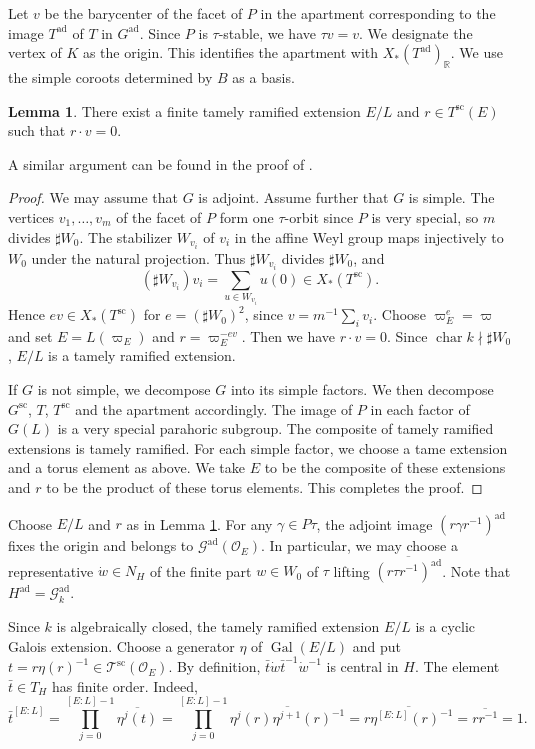 \documentclass[12pt]{article}
\DeclareMathOperator{\ad}{ad}
\newcommand\cO{\mathcal O}
\newcommand\cG{\mathcal G}
\newcommand\vp{\varpi}
\theoremstyle{definition}
\newtheorem{lemm}[theo]{Lemma}
\DeclareMathOperator{\Gal}{Gal}
\newcommand{\scs}{\mathrm{sc}}
\begin{document}
Let $v$ be the barycenter of the facet of $P$ in the apartment corresponding to the image $T^{\ad}$ of $T$ in $G^{\ad}$.
Since $P$ is $\tau$-stable, we have $\tau v=v$.
We designate the vertex of $K$ as the origin. This identifies the apartment with $X_*(T^{\ad})_{\mathbb R}$.
We use the simple coroots determined by $B$ as a basis.
\begin{lemm}\label{tame-extension}
There exist a finite tamely ramified extension $E/L$ and $r\in T^{\scs}(E)$ such that $r\cdot v=0$.
\end{lemm}

A similar argument can be found in the proof of \cite[Proposition 2.8]{PR24}.

\begin{proof}
We may assume that $G$ is adjoint.
Assume further that $G$ is simple.
The vertices $v_1,\ldots,v_m$ of the facet of $P$ form one $\tau$-orbit since $P$ is very special, so $m$ divides $\sharp W_0$.
The stabilizer $W_{v_i}$ of $v_i$ in the affine Weyl group maps injectively to $W_0$ under the natural projection.
Thus $\sharp W_{v_i}$ divides $\sharp W_0$, and
$$
(\sharp W_{v_i})v_i=\sum_{u\in W_{v_i}}u(0)\in X_*(T^{\scs}).
$$
Hence $ev\in X_*(T^{\scs})$ for $e=(\sharp W_0)^2$, since $v=m^{-1}\sum_i v_i$.
Choose $\vp_E^e=\vp$ and set $E=L(\vp_E)$ and $r=\vp_E^{-ev}$. Then we have $r\cdot v=0$.
Since $\operatorname{char}k\nmid \sharp W_0$, $E/L$ is a tamely ramified extension.

If $G$ is not simple, we decompose $G$ into its simple factors. We then decompose $G^{\scs}$, $T$, $T^{\scs}$ and the apartment accordingly.
The image of $P$ in each factor of $G(L)$ is a very special parahoric subgroup.
The composite of tamely ramified extensions is tamely ramified.
For each simple factor, we choose a tame extension and a torus element as above.
We take $E$ to be the composite of these extensions and $r$ to be the product of these torus elements.
This completes the proof.
\end{proof}

Choose $E/L$ and $r$ as in Lemma \ref{tame-extension}. For any $\gamma\in P\tau$, the adjoint image $(r\gamma r^{-1})^{\ad}$ fixes the origin and belongs to $\cG^{\ad}(\cO_E)$.
In particular, we may choose a representative $\dot w\in N_H$ of the finite part $w\in W_0$ of $\tau$ lifting $\overline{(r\tau r^{-1})^{\ad}}$.
Note that $H^{\ad}=\cG^{\ad}_k$.

Since $k$ is algebraically closed, the tamely ramified extension $E/L$ is a cyclic Galois extension. Choose a generator $\eta$ of $\Gal(E/L)$ and put $t=r\eta(r)^{-1}\in \mathcal T^{\scs}(\cO_E)$.
By definition, $\bar t\dot w \bar t^{-1}\dot w^{-1}$ is central in $H$.
The element $\bar t\in T_H$ has finite order. Indeed,
$$
\bar t^{[E:L]}=\prod_{j=0}^{[E:L]-1}\overline{\eta^j(t)}=\prod_{j=0}^{[E:L]-1}\overline{\eta^j(r)\eta^{j+1}(r)^{-1}}=\overline{r\eta^{[E:L]}(r)^{-1}}=\overline{rr^{-1}}=1.
$$
\end{document}
